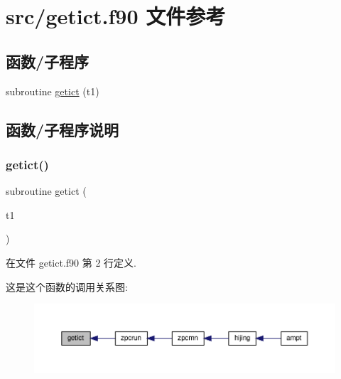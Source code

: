 \hypertarget{getict_8f90}{}\section{src/getict.f90 文件参考}
\label{getict_8f90}
\subsection*{函数/子程序}
\begin{DoxyCompactItemize}
\item 
subroutine \mbox{\hyperlink{getict_8f90_a33337b08e94e0725fef5e9f1fa104da6}{getict}} (t1)
\end{DoxyCompactItemize}


\subsection{函数/子程序说明}
\mbox{\label{getict_8f90_a33337b08e94e0725fef5e9f1fa104da6}} 
\subsubsection{\texorpdfstring{getict()}{getict()}}
{\footnotesize\ttfamily subroutine getict (\begin{DoxyParamCaption}\item[{}]{t1 }\end{DoxyParamCaption})}



在文件 getict.\+f90 第 2 行定义.

这是这个函数的调用关系图\+:
\nopagebreak
\begin{figure}[H]
\begin{center}
\leavevmode
\includegraphics[width=350pt]{getict_8f90_a33337b08e94e0725fef5e9f1fa104da6_icgraph}
\end{center}
\end{figure}
